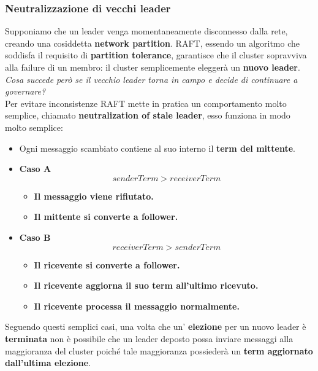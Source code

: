   \subsubsection{Neutralizzazione di vecchi leader}
  Supponiamo che un leader venga momentaneamente disconnesso dalla rete, creando una cosiddetta \textbf{network partition}. RAFT, essendo un algoritmo che soddisfa il requisito di \textbf{partition tolerance}, garantisce che il cluster sopravviva alla failure di un membro: il cluster semplicemente eleggerà un \textbf{nuovo leader}.\\
  \emph{Cosa succede però se il vecchio leader torna in campo e decide di continuare a governare?}\\
  Per evitare inconsistenze RAFT mette in pratica un comportamento molto semplice, chiamato \textbf{neutralization of stale leader}, esso funziona in modo molto semplice:
  \begin{itemize}
    \item{Ogni messaggio scambiato contiene al suo interno il \textbf{term del mittente}}.
    \item{\textbf{Caso A}}
      \[
        senderTerm > receiverTerm
      \]
      \begin{itemize}
        \item{\textbf{Il messaggio viene rifiutato.}}
        \item{\textbf{Il mittente si converte a follower.}}
      \end{itemize}
      \item{\textbf{Caso B}}
      \[
        receiverTerm > senderTerm
      \]
      \begin{itemize}
        \item{\textbf{Il ricevente si converte a follower.}}
        \item{\textbf{Il ricevente aggiorna il suo term all'ultimo ricevuto.}}
        \item{\textbf{Il ricevente processa il messaggio normalmente.}}
      \end{itemize}
  \end{itemize}
  Seguendo questi semplici casi, una volta che un' \textbf{elezione} per un nuovo leader è \textbf{terminata} non è possibile che un leader deposto possa inviare messaggi alla maggioranza del cluster poiché tale maggioranza possiederà un \textbf{term aggiornato dall'ultima elezione}.